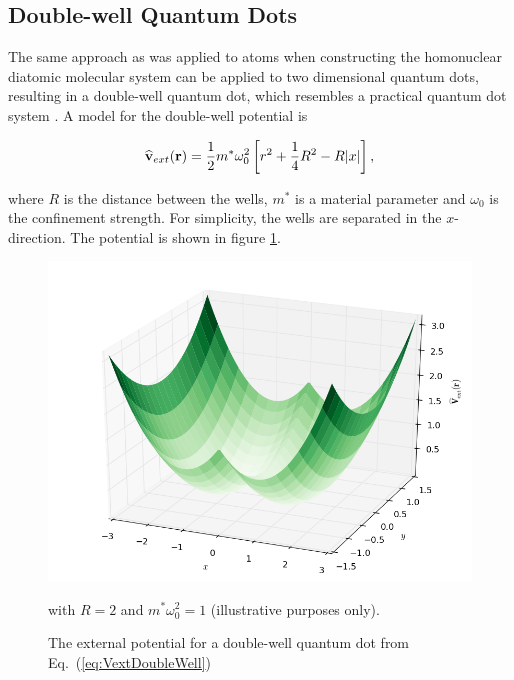 \subsection{Double-well Quantum Dots}

The same approach as was applied to atoms when constructing the homonuclear diatomic molecular system can be applied to two dimensional quantum dots, resulting in a double-well quantum dot, which resembles a practical quantum dot system \cite{doubleWellExpt}. A model for the double-well potential is \cite{ymwang}

\begin{equation}
 {\bf\widehat{v}}_{ext}(\mathbf{r}) = \frac{1}{2}m^\ast \omega_0^2 \left[r^2 + \frac{1}{4}R^2 - R|x|\right], \label{eq:VextDoubleWell}
\end{equation}

where $R$ is the distance between the wells, $m^\ast$ is a material parameter and $\omega_0$ is the confinement strength. For simplicity, the wells are separated in the $x$-direction. The potential is shown in figure \ref{fig:extPotDoubleWell}.

\begin{figure}
 \begin{center}
  \includegraphics[scale=0.5]{../Graphics/Potentials/doubleWell.png}
  \caption{The external potential for a double-well quantum dot from Eq.~(\ref{eq:VextDoubleWell})} with $R=2$ and $m^\ast\omega_0^2 = 1$ (illustrative purposes only).
  \label{fig:extPotDoubleWell}
 \end{center}
\end{figure}

